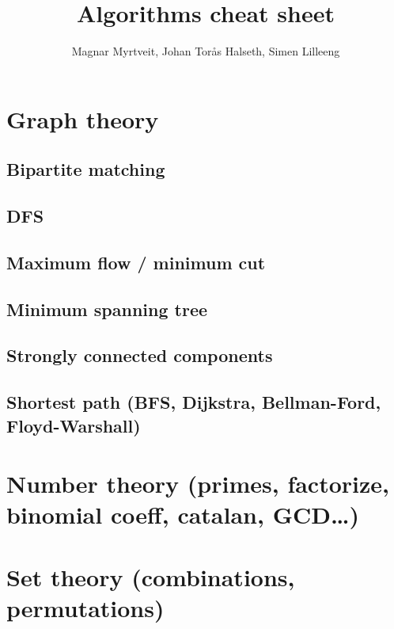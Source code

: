 \documentclass[a4paper, 11pt]{article}
\title{Algorithms cheat sheet}
\author{Magnar Myrtveit, Johan Torås Halseth, Simen Lilleeng}
\def\path{..}
\begin{document}
\maketitle
\tableofcontents

\clearpage
\section{Graph theory}
\subsection{Bipartite matching}


\clearpage
\subsection{DFS}


\clearpage
\subsection{Maximum flow / minimum cut}


\clearpage
\subsection{Minimum spanning tree}


\clearpage
\subsection{Strongly connected components}


\clearpage
\subsection{Shortest path (BFS, Dijkstra, Bellman-Ford, Floyd-Warshall)}


\clearpage
\section{Number theory (primes, factorize, binomial coeff, catalan, GCD\dots)}


\clearpage
\section{Set theory (combinations, permutations)}

\end{document}
